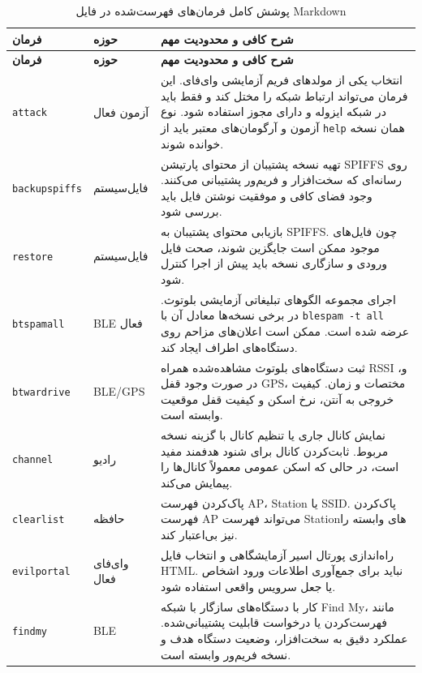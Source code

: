 \documentclass[11pt,a4paper]{article}
\newcommand{\lr}[1]{\foreignlanguage{english}{#1}}
\newcommand{\en}[1]{\lr{#1}}
\newcommand{\cmd}[1]{\lr{\nolinkurl{#1}}}
\begin{document}
\begin{longtable}{>{\raggedright\arraybackslash}p{3.4cm} >{\raggedleft\arraybackslash}p{3.2cm} >{\raggedleft\arraybackslash}p{8.7cm}}
\caption{پوشش کامل فرمان‌های فهرست‌شده در فایل \en{Markdown}}\label{tab:all-md-commands}\\
\toprule
\textbf{فرمان} & \textbf{حوزه} & \textbf{شرح کافی و محدودیت مهم} \\
\midrule
\endfirsthead
\toprule
\textbf{فرمان} & \textbf{حوزه} & \textbf{شرح کافی و محدودیت مهم} \\
\midrule
\endhead
\bottomrule
\endfoot
\cmd{attack} & آزمون فعال & انتخاب یکی از مولدهای فریم آزمایشی وای‌فای. این فرمان می‌تواند ارتباط شبکه را مختل کند و فقط باید در شبکه ایزوله و دارای مجوز استفاده شود. نوع آزمون و آرگومان‌های معتبر باید از \cmd{help} همان نسخه خوانده شوند. \\
\cmd{backupspiffs} & فایل‌سیستم & تهیه نسخه پشتیبان از محتوای پارتیشن \en{SPIFFS} روی رسانه‌ای که سخت‌افزار و فریم‌ور پشتیبانی می‌کنند. وجود فضای کافی و موفقیت نوشتن فایل باید بررسی شود. \\
\cmd{restore} & فایل‌سیستم & بازیابی محتوای پشتیبان به \en{SPIFFS}. چون فایل‌های موجود ممکن است جایگزین شوند، صحت فایل ورودی و سازگاری نسخه باید پیش از اجرا کنترل شود. \\
\cmd{btspamall} & \en{BLE} فعال & اجرای مجموعه الگوهای تبلیغاتی آزمایشی بلوتوث. در برخی نسخه‌ها معادل آن با \cmd{blespam -t all} عرضه شده است. ممکن است اعلان‌های مزاحم روی دستگاه‌های اطراف ایجاد کند. \\
\cmd{btwardrive} & \en{BLE/GPS} & ثبت دستگاه‌های بلوتوث مشاهده‌شده همراه RSSI و، در صورت وجود قفل GPS، مختصات و زمان. کیفیت خروجی به آنتن، نرخ اسکن و کیفیت قفل موقعیت وابسته است. \\
\cmd{channel} & رادیو & نمایش کانال جاری یا تنظیم کانال با گزینه نسخه مربوط. ثابت‌کردن کانال برای شنود هدفمند مفید است، در حالی که اسکن عمومی معمولاً کانال‌ها را پیمایش می‌کند. \\
\cmd{clearlist} & حافظه & پاک‌کردن فهرست AP، Station یا SSID. پاک‌کردن فهرست AP می‌تواند فهرست Stationهای وابسته را نیز بی‌اعتبار کند. \\
\cmd{evilportal} & وای‌فای فعال & راه‌اندازی پورتال اسیر آزمایشگاهی و انتخاب فایل HTML. نباید برای جمع‌آوری اطلاعات ورود اشخاص یا جعل سرویس واقعی استفاده شود. \\
\cmd{findmy} & \en{BLE} & کار با دستگاه‌های سازگار با شبکه \en{Find My}، مانند فهرست‌کردن یا درخواست قابلیت پشتیبانی‌شده. عملکرد دقیق به سخت‌افزار، وضعیت دستگاه هدف و نسخه فریم‌ور وابسته است. \\

\end{longtable}
\end{document}
